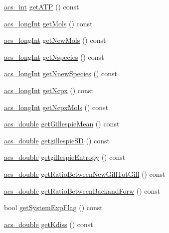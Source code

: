 \begin{DoxyCompactItemize}
\hyperlink{a00050_a8d277355641a098190360234e2ebde35}{acs\-\_\-int} \hyperlink{a00014_a02346c5d824e83e0a76dd01f4672ad8b}{get\-A\-T\-P} () const 
\item 
\hyperlink{a00050_a19319d75f02db4308bc5c0026d98cd85}{acs\-\_\-long\-Int} \hyperlink{a00014_a5a2ee72147144e7a04f4b363f1cc0914}{get\-Mols} () const 
\item 
\hyperlink{a00050_a19319d75f02db4308bc5c0026d98cd85}{acs\-\_\-long\-Int} \hyperlink{a00014_a57e1eb6043a54fbebd2ac01ebdac9fa1}{get\-New\-Mols} () const 
\item 
\hyperlink{a00050_a19319d75f02db4308bc5c0026d98cd85}{acs\-\_\-long\-Int} \hyperlink{a00014_aebc2bf6d400686a73dae1f6162cfeadc}{get\-Nspecies} () const 
\item 
\hyperlink{a00050_a19319d75f02db4308bc5c0026d98cd85}{acs\-\_\-long\-Int} \hyperlink{a00014_a4a2b21d139acc93ae0fdf29c8b025cce}{get\-Nnew\-Species} () const 
\item 
\hyperlink{a00050_a19319d75f02db4308bc5c0026d98cd85}{acs\-\_\-long\-Int} \hyperlink{a00014_a5f6c40cbf788d58db588dc6280f0174f}{get\-Ncpx} () const 
\item 
\hyperlink{a00050_a19319d75f02db4308bc5c0026d98cd85}{acs\-\_\-long\-Int} \hyperlink{a00014_a39bb98a336b69f25479b8f82b9928bd3}{get\-Ncpx\-Mols} () const 
\item 
\hyperlink{a00050_ab776853a005fcbf56af0424a2a4dd607}{acs\-\_\-double} \hyperlink{a00014_a389a70abe42c7652c9511b7ed3b974c0}{get\-Gillespie\-Mean} () const 
\item 
\hyperlink{a00050_ab776853a005fcbf56af0424a2a4dd607}{acs\-\_\-double} \hyperlink{a00014_a41d9f79794b74845f2d00b4c0affea02}{getgillespie\-S\-D} () const 
\item 
\hyperlink{a00050_ab776853a005fcbf56af0424a2a4dd607}{acs\-\_\-double} \hyperlink{a00014_af4cba1a1f9c1c0106241ca5338b7906d}{getgillespie\-Entropy} () const 
\item 
\hyperlink{a00050_ab776853a005fcbf56af0424a2a4dd607}{acs\-\_\-double} \hyperlink{a00014_a98a4989029d77e99cf2ca9fb0eb1c2ab}{get\-Ratio\-Between\-New\-Gill\-Tot\-Gill} () const 
\item 
\hyperlink{a00050_ab776853a005fcbf56af0424a2a4dd607}{acs\-\_\-double} \hyperlink{a00014_aa0e7940868932ac4b26fd61943952528}{get\-Ratio\-Between\-Backand\-Forw} () const 
\item 
bool \hyperlink{a00014_a883327bbb969164eb8b3c2d1c941ca03}{get\-System\-Exp\-Flag} () const 
\item 
\hyperlink{a00050_ab776853a005fcbf56af0424a2a4dd607}{acs\-\_\-double} \hyperlink{a00014_ab429d2057ee1092bf210c29e70153f75}{get\-Kdiss} () const 

\end{DoxyCompactItemize}
